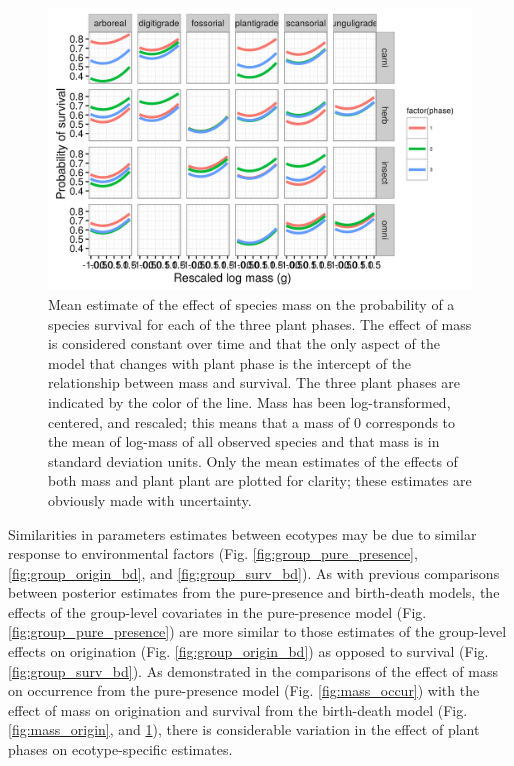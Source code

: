\documentclass[12pt,letterpaper]{article}
\begin{document}
\begin{figure}[ht]
  \centering
  \includegraphics[width=\textwidth,height=0.4\textheight,keepaspectratio=true]{figure/mass_on_surv_bd}
  \caption[Effect of mass on probability of species survival as estimated from the birth-death model]{Mean estimate of the effect of species mass on the probability of a species survival for each of the three plant phases. The effect of mass is considered constant over time and that the only aspect of the model that changes with plant phase is the intercept of the relationship between mass and survival. The three plant phases are indicated by the color of the line. Mass has been log-transformed, centered, and rescaled; this means that a mass of 0 corresponds to the mean of log-mass of all observed species and that mass is in standard deviation units. Only the mean estimates of the effects of both mass and plant plant are plotted for clarity; these estimates are obviously made with uncertainty.}
  \label{fig:mass_survival}
\end{figure}



Similarities in parameters estimates between ecotypes may be due to similar response to environmental factors (Fig. \ref{fig:group_pure_presence}, \ref{fig:group_origin_bd}, and \ref{fig:group_surv_bd}). As with previous comparisons between posterior estimates from the pure-presence and birth-death models, the effects of the group-level covariates in the pure-presence model (Fig. \ref{fig:group_pure_presence})  are more similar to those estimates of the group-level effects on origination (Fig. \ref{fig:group_origin_bd}) as opposed to survival (Fig. \ref{fig:group_surv_bd}). As demonstrated in the comparisons of the effect of mass on occurrence from the pure-presence model (Fig. \ref{fig:mass_occur}) with the effect of mass on origination and survival from the birth-death model (Fig. \ref{fig:mass_origin}, and \ref{fig:mass_survival}), there is considerable variation in the effect of plant phases on ecotype-specific estimates.
\end{document}
